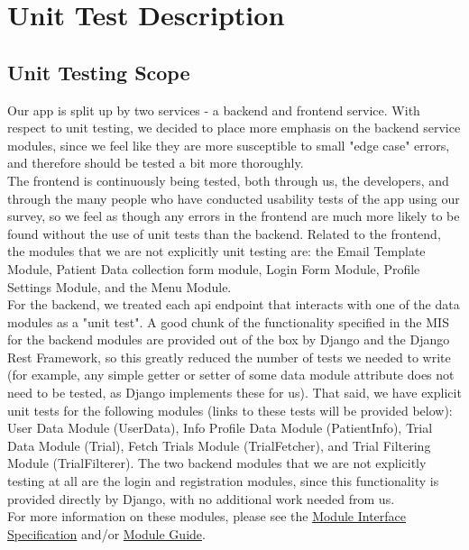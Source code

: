\documentclass[12pt, titlepage]{article}
\begin{document}
\section{Unit Test Description}

\subsection{Unit Testing Scope}

Our app is split up by two services - a backend and frontend service. With respect to unit testing, we decided to place more emphasis on the backend service modules,
since we feel like they are more susceptible to small "edge case" errors, and therefore should be tested a bit more thoroughly. \\

The frontend is continuously being tested, both through us, the developers, and through the many people who have conducted usability tests of the app using our survey, so we feel as though
any errors in the frontend are much more likely to be found without the use of unit tests than the backend. Related to the frontend, the modules that we are not explicitly unit testing are: 
the Email Template Module, Patient Data collection form module, Login Form Module, Profile Settings Module, and the Menu Module.\\

For the backend, we treated each api endpoint that interacts with one of the data modules as a "unit test". A good chunk of the functionality specified 
in the MIS for the backend modules are provided out of the box by Django and the Django Rest Framework, so this greatly reduced the number 
of tests we needed to write (for example, any simple getter or setter of some data module attribute does not need to be tested, as Django 
implements these for us). That said, we have explicit unit tests for the following modules (links to these tests will be provided below): User Data Module (UserData),
Info Profile Data Module (PatientInfo), Trial Data Module (Trial), Fetch Trials Module (TrialFetcher), and Trial Filtering Module (TrialFilterer). The two backend 
modules that we are not explicitly testing at all are the login and registration modules, since this functionality is provided directly by Django, with no 
additional work needed from us.\\

For more information on these modules, please see the \href{https://github.com/davimang/REACH/tree/main/docs/Design/SoftDetailedDes}{Module Interface Specification} and/or \href{https://github.com/davimang/REACH/blob/main/docs/Design/SoftArchitecture/MG.pdf}{Module Guide}.
\end{document}

